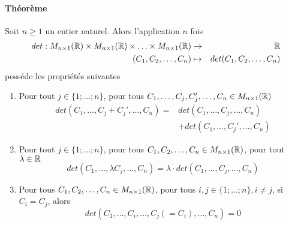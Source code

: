 \paragraph{Théorème} Soit $n\geq 1$ un entier naturel. Alors l'application $n$ fois
\begin{eqnarray*}
  det: M_{n\times 1}(\mathbb{R}) \times M_{n\times 1}(\mathbb{R}) \times \ldots \times M_{n\times 1}(\mathbb{R}) &\rightarrow& \mathbb{R} \\
  (C_1, C_2, \ldots, C_n) &\mapsto& det(C_1, C_2, \ldots, C_n)
\end{eqnarray*}
posséde les propriétés suivantes
\begin{enumerate}
  \item Pour tout $j \in \{1; \ldots; n \}$, pour tous $C_1, \ldots, C_j, C_j', \ldots, C_n \in M_{n\times 1}(\mathbb{R})$
    \begin{eqnarray*}
      det(C_1, \ldots, C_j + C_j', \ldots, C_n) =& det(C_1, \ldots, C_j, \ldots, C_n) \\
        &+ det(C_1, \ldots, C_j', \ldots, C_n)
    \end{eqnarray*}
    
  \item Pour tout $j \in \{1; \ldots; n\}$, pour tous $C_1, C_2, \ldots, C_n \in M_{n\times 1}(\mathbb{R})$, pour tout $\lambda \in \mathbb{R}$
    $$det(C_1, \ldots, \lambda C_j, \ldots, C_n) = \lambda \cdot det(C_1, \ldots, C_j, \ldots, C_n)$$
    
  \item Pour tous $C_1, C_2, \ldots, C_n \in M_{n\times 1}(\mathbb{R})$, pour tous $i, j \in \{1; \ldots; n\}, i \neq j$, si $C_i = C_j$, alors
    $$det(C_1, \ldots, C_i, \ldots, C_j(=C_i), \ldots, C_n) = 0$$
\end{enumerate}

